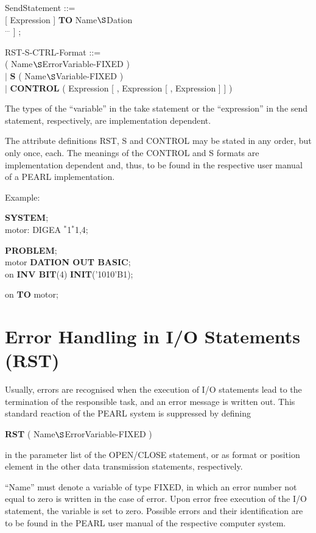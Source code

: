 SendStatement ::=\\
 [ Expression ] {\bf TO} Name$\S $Dation\\
\x \x [ {\bf BY} RST-S-CTRL-Format [ , RST-S-CTRL-Format ] $^{...}$ ] ;

RST-S-CTRL-Format ::=\\
 ( Name$\S $ErrorVariable-FIXED )\\
\x $\mid$ {\bf S} ( Name$\S $Variable-FIXED )\\
\x $\mid$ {\bf CONTROL} ( Expression [ , Expression [ , Expression ] ] )

The types of the ``variable'' in the take statement or the
``expression'' in the send statement, respectively, are implementation
dependent.

The attribute definitions RST, S and CONTROL may be stated in any
order, but only once, each. The meanings of the CONTROL and S formats
are implementation dependent and, thus, to be found in the respective
user manual of a PEARL implementation.

Example:

{\bf SYSTEM};\\
\x motor: DIGEA $^*$1$^*$1,4;

{\bf PROBLEM};\\
 motor {\bf DATION OUT BASIC};\\
 on {\bf INV BIT}(4) {\bf INIT}('1010'B1);

 on {\bf TO} motor;

\section{Error Handling in I/O Statements (RST)}    %
\label{sec_dation_rst}

Usually, errors are recognised when the execution of I/O statements lead to the
termination of the responsible task, and an error message is written
out. This standard reaction of the PEARL system is suppressed by
defining

{\bf RST} ( Name$\S $ErrorVariable-FIXED )

in the parameter list of the OPEN/CLOSE statement, or as format or
position element in the other data transmission statements,
respectively.

``Name'' must denote a variable of type FIXED, in which an error number
not equal to zero is written in the case of error. Upon error free
execution of the I/O statement, the variable is set to zero. Possible
errors and their identification are to be found in the PEARL user manual
of the respective computer system.

